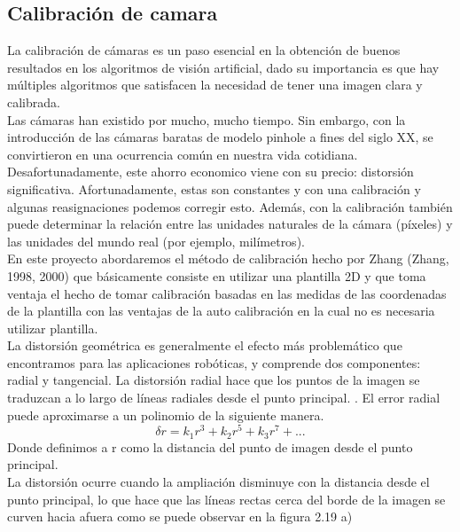 \subsection{Calibración de camara}
La calibración de cámaras es un paso esencial en la obtención de buenos resultados
en los algoritmos de visión artificial, dado su importancia es que hay múltiples
algoritmos que satisfacen la necesidad de tener una imagen clara y calibrada.\\
Las cámaras han existido por mucho, mucho tiempo. Sin embargo, con la introducción de
las cámaras baratas de modelo pinhole a fines del siglo XX, se convirtieron en una
ocurrencia común en nuestra vida cotidiana. Desafortunadamente, este ahorro economico viene
con su precio: distorsión significativa. Afortunadamente, estas son constantes y con
una calibración y algunas reasignaciones podemos corregir esto. Además,
con la calibración también puede determinar la relación entre las unidades naturales
de la cámara (píxeles) y las unidades del mundo real (por ejemplo, milímetros).\cite{WEB:OpencvCalibracion}\\
En este proyecto abordaremos el método de calibración hecho por Zhang (Zhang, 1998, 2000)
que básicamente consiste en utilizar una plantilla 2D y que toma ventaja el hecho de tomar
calibración basadas en las medidas de
las coordenadas de la plantilla con las ventajas de la
auto calibración en la cual no es necesaria utilizar
plantilla.\\
La distorsión geométrica es generalmente el efecto más problemático que encontramos para las aplicaciones robóticas,
y comprende dos componentes: radial y tangencial. La distorsión radial hace que los puntos de la imagen se
traduzcan a lo largo de líneas radiales desde el punto principal. \cite{Book:Corke2011}. El error radial puede
aproximarse a un polinomio de la siguiente manera.
\begin{equation}
	\delta r = k_1 r^3 + k_2 r^5 + k_3 r^7 + ...
\end{equation}
Donde definimos a r como la distancia del punto de imagen desde el punto principal.\\
La distorsión ocurre cuando la ampliación disminuye con la distancia desde el punto principal, lo que hace
que las líneas rectas cerca del borde de la imagen se curven hacia afuera como se puede observar en la figura 2.19 a)
